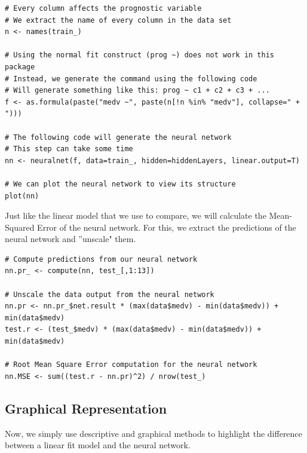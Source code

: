 \begin{lstlisting}
# Every column affects the prognostic variable
# We extract the name of every column in the data set
n <- names(train_)

# Using the normal fit construct (prog ~) does not work in this package
# Instead, we generate the command using the following code
# Will generate something like this: prog ~ c1 + c2 + c3 + ...
f <- as.formula(paste("medv ~", paste(n[!n %in% "medv"], collapse=" + ")))

# The following code will generate the neural network
# This step can take some time
nn <- neuralnet(f, data=train_, hidden=hiddenLayers, linear.output=T)

# We can plot the neural network to view its structure
plot(nn)
\end{lstlisting}

Just like the linear model that we use to compare, we will calculate the Mean-Squared Error of the neural network. For this, we extract the predictions of the neural network and ''unscale" them. 

\begin{lstlisting}
# Compute predictions from our neural network
nn.pr_ <- compute(nn, test_[,1:13])

# Unscale the data output from the neural network
nn.pr <- nn.pr_$net.result * (max(data$medv) - min(data$medv)) + min(data$medv)
test.r <- (test_$medv) * (max(data$medv) - min(data$medv)) + min(data$medv)

# Root Mean Square Error computation for the neural network
nn.MSE <- sum((test.r - nn.pr)^2) / nrow(test_)
\end{lstlisting}

\subsection{Graphical Representation}

Now, we simply use descriptive and graphical methods to highlight the difference between a linear fit model and the neural network.

